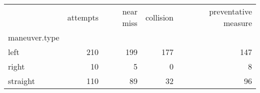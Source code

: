 \begin{tabular}{lrrrr}
\toprule
{} &  attempts &  near miss &  collision &  preventative measure \\
maneuver.type &           &            &            &                       \\
\midrule
left          &       210 &        199 &        177 &                   147 \\
right         &        10 &          5 &          0 &                     8 \\
straight      &       110 &         89 &         32 &                    96 \\
\bottomrule
\end{tabular}
